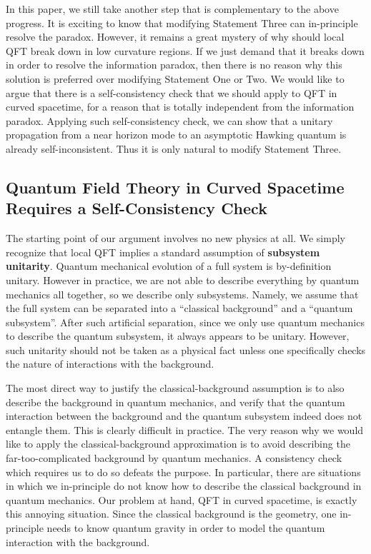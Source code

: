 \documentclass[aps,showpacs,onecolumn,floats,prd,superscriptaddress,nofootinbib]{revtex4-1}
\begin{document}
In this paper, we still take another step that is complementary to the above progress. It is exciting to know that modifying Statement Three can in-principle resolve the paradox. 
However, it remains a great mystery of why should local QFT break down in low curvature regions. 
If we just demand that it breaks down in order to resolve the information paradox, then there is no reason why this solution is preferred over modifying Statement One or Two. 
We would like to argue that there is a self-consistency check that we should apply to QFT in curved spacetime, for a reason that is totally independent from the information paradox.
Applying such self-consistency check, we can show that a unitary propagation from a near horizon mode to an asymptotic Hawking quantum is already self-inconsistent. 
Thus it is only natural to modify Statement Three.

\subsection{Quantum Field Theory in Curved Spacetime Requires a Self-Consistency Check}

The starting point of our argument involves no new physics at all.
We simply recognize that local QFT implies a standard assumption of {\bf subsystem unitarity}.
Quantum mechanical evolution of a full system is by-definition unitary. 
However in practice, we are not able to describe everything by quantum mechanics all together, so we describe only subsystems. 
Namely, we assume that the full system can be separated into a ``classical background'' and a ``quantum subsystem''. 
After such artificial separation, since we only use quantum mechanics to describe the quantum subsystem, it always appears to be unitary.
However, such unitarity should not be taken as a physical fact unless one specifically checks the nature of interactions with the background.

The most direct way to justify the classical-background assumption is to also describe the background in quantum mechanics, and verify that the quantum interaction between the background and the quantum subsystem indeed does not entangle them. 
This is clearly difficult in practice. 
The very reason why we would like to apply the classical-background approximation is to avoid describing the far-too-complicated background by quantum mechanics. 
A consistency check which requires us to do so defeats the purpose. 
In particular, there are situations in which we in-principle do not know how to describe the classical background in quantum mechanics. 
Our problem at hand, QFT in curved spacetime, is exactly this annoying situation. 
Since the classical background is the geometry, one in-principle needs to know quantum gravity in order to model the quantum interaction with the background. 
\end{document}

